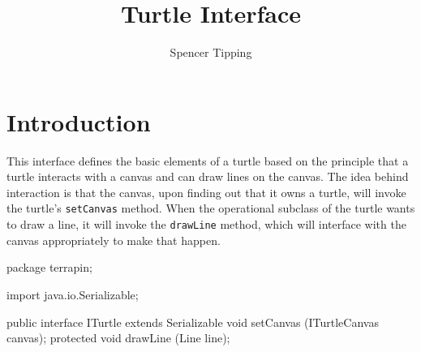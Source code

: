 \documentclass{article}
\begin{document}
  \title{Turtle Interface}
  \author{Spencer Tipping}
  \maketitle

  \tableofcontents

  \section{Introduction}
    \label{sec:introduction}

    This interface defines the basic elements of a turtle based on the principle that a turtle interacts with a canvas and can draw lines on the canvas. The
    idea behind interaction is that the canvas, upon finding out that it owns a turtle, will invoke the turtle's {\tt setCanvas} method. When the operational
    subclass of the turtle wants to draw a line, it will invoke the {\tt drawLine} method, which will interface with the canvas appropriately to make that
    happen.

    \begin{javacode}
package terrapin;

import java.io.Serializable;

public interface ITurtle extends Serializable {
  void           setCanvas (ITurtleCanvas canvas);
  protected void drawLine  (Line line);
}
    \end{javacode}
\end{document}
